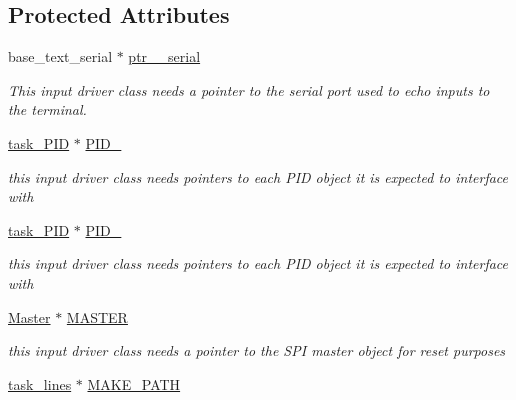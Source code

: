 \subsection*{Protected Attributes}
\begin{DoxyCompactItemize}
\item 
\hypertarget{classtask__read_a2c44e2c5f153938a1db87c277ae6476c}{base\-\_\-text\-\_\-serial $\ast$ \hyperlink{classtask__read_a2c44e2c5f153938a1db87c277ae6476c}{ptr\-\_\-\_\-serial}}\label{classtask__read_a2c44e2c5f153938a1db87c277ae6476c}

\begin{DoxyCompactList}\small\item\em This input driver class needs a pointer to the serial port used to echo inputs to the terminal. \end{DoxyCompactList}\item 
\hypertarget{classtask__read_a7ca1336ab22aaffc1a5d2c8d7d426d25}{\hyperlink{classtask__PID}{task\-\_\-\-P\-I\-D} $\ast$ \hyperlink{classtask__read_a7ca1336ab22aaffc1a5d2c8d7d426d25}{P\-I\-D\-\_}}\label{classtask__read_a7ca1336ab22aaffc1a5d2c8d7d426d25}

\begin{DoxyCompactList}\small\item\em this input driver class needs pointers to each P\-I\-D object it is expected to interface with \end{DoxyCompactList}\item 
\hypertarget{classtask__read_a5b9f8ebc163883379819589d378f3ad6}{\hyperlink{classtask__PID}{task\-\_\-\-P\-I\-D} $\ast$ \hyperlink{classtask__read_a5b9f8ebc163883379819589d378f3ad6}{P\-I\-D\-\_}}\label{classtask__read_a5b9f8ebc163883379819589d378f3ad6}

\begin{DoxyCompactList}\small\item\em this input driver class needs pointers to each P\-I\-D object it is expected to interface with \end{DoxyCompactList}\item 
\hypertarget{classtask__read_abb8403f54a536520302a191b105c1aa3}{\hyperlink{classMaster}{Master} $\ast$ \hyperlink{classtask__read_abb8403f54a536520302a191b105c1aa3}{M\-A\-S\-T\-E\-R}}\label{classtask__read_abb8403f54a536520302a191b105c1aa3}

\begin{DoxyCompactList}\small\item\em this input driver class needs a pointer to the S\-P\-I master object for reset purposes \end{DoxyCompactList}\item 
\hypertarget{classtask__read_a081e0558ca0461e26aa722a86708ab85}{\hyperlink{classtask__lines}{task\-\_\-lines} $\ast$ \hyperlink{classtask__read_a081e0558ca0461e26aa722a86708ab85}{M\-A\-K\-E\-\_\-\-P\-A\-T\-H}}\label{classtask__read_a081e0558ca0461e26aa722a86708ab85}


\end{DoxyCompactItemize}
